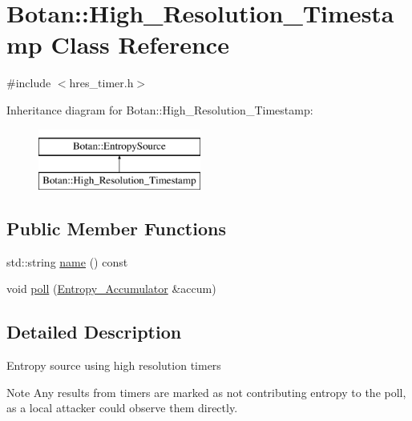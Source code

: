 \hypertarget{classBotan_1_1High__Resolution__Timestamp}{\section{Botan\-:\-:High\-\_\-\-Resolution\-\_\-\-Timestamp Class Reference}
\label{classBotan_1_1High__Resolution__Timestamp}
}


{\ttfamily \#include $<$hres\-\_\-timer.\-h$>$}

Inheritance diagram for Botan\-:\-:High\-\_\-\-Resolution\-\_\-\-Timestamp\-:\begin{figure}[H]
\begin{center}
\leavevmode
\includegraphics[height=2.000000cm]{classBotan_1_1High__Resolution__Timestamp}
\end{center}
\end{figure}
\subsection*{Public Member Functions}
\begin{DoxyCompactItemize}
\item 
std\-::string \hyperlink{classBotan_1_1High__Resolution__Timestamp_a72688ecec1b9100b49c7081384d69319}{name} () const 
\item 
void \hyperlink{classBotan_1_1High__Resolution__Timestamp_af11b30a6909a998d7ad247f8b865805e}{poll} (\hyperlink{classBotan_1_1Entropy__Accumulator}{Entropy\-\_\-\-Accumulator} \&accum)
\end{DoxyCompactItemize}


\subsection{Detailed Description}
Entropy source using high resolution timers

\begin{DoxyNote}{Note}
Any results from timers are marked as not contributing entropy to the poll, as a local attacker could observe them directly. 
\end{DoxyNote}


